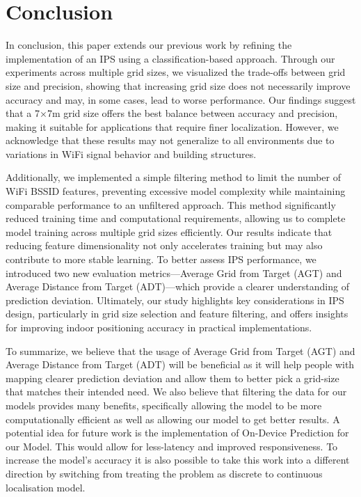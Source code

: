 \documentclass[runningheads]{llncs}
\begin{document}
\section{Conclusion}
\vspace{-10pt}
In conclusion, this paper extends our previous work by refining the implementation of an IPS using a classification-based approach. Through our experiments across multiple grid sizes, we visualized the trade-offs between grid size and precision, showing that increasing grid size does not necessarily improve accuracy and may, in some cases, lead to worse performance. Our findings suggest that a 7×7m grid size offers the best balance between accuracy and precision, making it suitable for applications that require finer localization. However, we acknowledge that these results may not generalize to all environments due to variations in WiFi signal behavior and building structures.

Additionally, we implemented a simple filtering method to limit the number of WiFi BSSID features, preventing excessive model complexity while maintaining comparable performance to an unfiltered approach. This method significantly reduced training time and computational requirements, allowing us to complete model training across multiple grid sizes efficiently. Our results indicate that reducing feature dimensionality not only accelerates training but may also contribute to more stable learning. To better assess IPS performance, we introduced two new evaluation metrics—Average Grid from Target (AGT) and Average Distance from Target (ADT)—which provide a clearer understanding of prediction deviation. Ultimately, our study highlights key considerations in IPS design, particularly in grid size selection and feature filtering, and offers insights for improving indoor positioning accuracy in practical implementations.

To summarize, we believe that the usage of Average Grid from Target (AGT)
and Average Distance from Target (ADT) will be beneficial as it will help people with mapping clearer prediction deviation and allow them to better pick a grid-size that matches their intended need. We also believe that filtering the data for our models provides many benefits, specifically allowing the model to be more computationally efficient as well as allowing our model to get better results. A potential idea for future work is the implementation of On-Device Prediction for our Model. This would allow for less-latency and improved responsiveness. To increase the model’s accuracy it is also possible to take this work into a different direction by switching from treating the problem as discrete to continuous localisation model.

\nocite{bgp4, add2, add3, add4}


\end{document}
